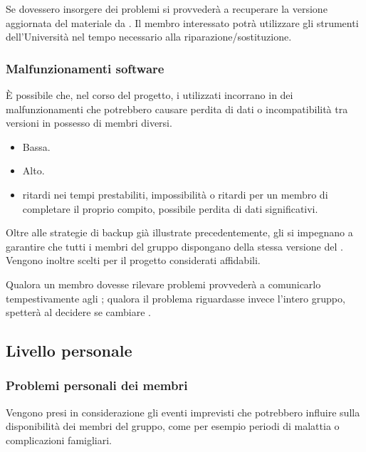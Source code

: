 \documentclass[a4paper, titlepage]{article}
\begin{document}
	Se dovessero insorgere dei problemi si provvederà a recuperare la versione aggiornata del materiale da .	Il membro interessato potrà utilizzare gli strumenti dell'Università nel tempo necessario alla riparazione/sostituzione.
	
	
	\subsubsection{Malfunzionamenti software}
	È possibile che, nel corso del progetto, i  utilizzati incorrano in dei malfunzionamenti che potrebbero causare perdita di dati o incompatibilità tra versioni in possesso di membri diversi.
	
	\begin{itemize}
		\item {} Bassa.
		\item {} Alto.
		\item {} ritardi nei tempi prestabiliti, impossibilità o ritardi per un membro di completare il proprio compito, possibile perdita di dati significativi.
	\end{itemize}
	
	Oltre alle strategie di backup già illustrate precedentemente, gli  si impegnano a garantire che tutti i membri del gruppo dispongano della stessa versione del . Vengono inoltre scelti per il progetto  considerati affidabili.
	
	Qualora un membro dovesse rilevare problemi  provvederà a comunicarlo tempestivamente agli ; qualora il problema riguardasse invece l'intero gruppo, spetterà al  decidere se cambiare .
	
	
	\subsection{Livello personale}
	\subsubsection{Problemi personali dei membri}
	Vengono presi in considerazione gli eventi imprevisti che potrebbero influire sulla disponibilità dei membri del gruppo, come per esempio periodi di malattia o complicazioni famigliari.
	
\end{document}
